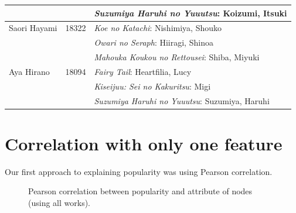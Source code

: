 \begin{table}[!h]
\begin{center}
\begin{tabular}{|l|c|l|}
		 & & \textit{Suzumiya Haruhi no Yuuutsu}: Koizumi, Itsuki \\ 
		\hline
		Saori Hayami & 18322 & \textit{Koe no Katachi}: Nishimiya, Shouko \\ 
		 & & \textit{Owari no Seraph}: Hiiragi, Shinoa \\ 
		 & & \textit{Mahouka Koukou no Rettousei}: Shiba, Miyuki \\
		\hline
		Aya Hirano & 18094 & \textit{Fairy Tail}: Heartfilia, Lucy \\ 
		 & & \textit{Kiseijuu: Sei no Kakuritsu}: Migi \\ 
		 & & \textit{Suzumiya Haruhi no Yuuutsu}: Suzumiya, Haruhi \\
		\hline
	\end{tabular}
	\end{center}
\end{table}

\newpage
\section{Correlation with only one feature}
Our first approach to explaining popularity was using Pearson correlation.

\begin{figure}[!h]
	\begin{flushleft}
	\caption{Pearson correlation between popularity and attribute of nodes (using all works).}
	\label{fig:pearsonCorrAllWorks}
	\end{flushleft}
\end{figure}

